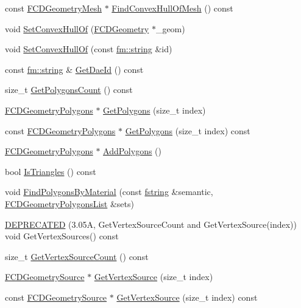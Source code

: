 \begin{DoxyCompactItemize}
const \hyperlink{classFCDGeometryMesh}{FCDGeometryMesh} $\ast$ \hyperlink{classFCDGeometryMesh_a0b975dd5d261b1185ddb8a0af4d55c9d}{FindConvexHullOfMesh} () const 
\item 
void \hyperlink{classFCDGeometryMesh_ab1698e8b1d977dd22bfd83812ecfd5bb}{SetConvexHullOf} (\hyperlink{classFCDGeometry}{FCDGeometry} $\ast$\_\-geom)
\item 
void \hyperlink{classFCDGeometryMesh_aaaceaa775bf5c5d83383184553effaa8}{SetConvexHullOf} (const \hyperlink{classfm_1_1stringT}{fm::string} \&id)
\item 
const \hyperlink{classfm_1_1stringT}{fm::string} \& \hyperlink{classFCDGeometryMesh_aa5a466bf4030f5569f45521e94bc4e55}{GetDaeId} () const 
\item 
size\_\-t \hyperlink{classFCDGeometryMesh_a4084371b8ae62cd07762775f81f9f613}{GetPolygonsCount} () const 
\item 
\hyperlink{classFCDGeometryPolygons}{FCDGeometryPolygons} $\ast$ \hyperlink{classFCDGeometryMesh_a990c21288535abe1d92c89b71ff662e3}{GetPolygons} (size\_\-t index)
\item 
const \hyperlink{classFCDGeometryPolygons}{FCDGeometryPolygons} $\ast$ \hyperlink{classFCDGeometryMesh_a99cbf42129bc06552153e4a2fc6a5910}{GetPolygons} (size\_\-t index) const 
\item 
\hyperlink{classFCDGeometryPolygons}{FCDGeometryPolygons} $\ast$ \hyperlink{classFCDGeometryMesh_a6a9c6a30b6cfc7d0a98a02b879c47e65}{AddPolygons} ()
\item 
bool \hyperlink{classFCDGeometryMesh_a490c6becbbbca137d2634c8d6ba818b9}{IsTriangles} () const 
\item 
void \hyperlink{classFCDGeometryMesh_a5a336363d9cb4f255d81ed8cf6fab8b7}{FindPolygonsByMaterial} (const \hyperlink{classfm_1_1stringT}{fstring} \&semantic, \hyperlink{classfm_1_1pvector}{FCDGeometryPolygonsList} \&sets)
\item 
\hyperlink{classFCDGeometryMesh_a0dd57bbe0bd7f6a2dfe58bdc140cf613}{DEPRECATED} (3.05A, GetVertexSourceCount and GetVertexSource(index)) void GetVertexSources() const 
\item 
size\_\-t \hyperlink{classFCDGeometryMesh_a5c0629b519bf32d5f4f172e3b0502de9}{GetVertexSourceCount} () const 
\item 
\hyperlink{classFCDGeometrySource}{FCDGeometrySource} $\ast$ \hyperlink{classFCDGeometryMesh_a728dd8d9dc103b9c9a4013dd882344ee}{GetVertexSource} (size\_\-t index)
\item 
const \hyperlink{classFCDGeometrySource}{FCDGeometrySource} $\ast$ \hyperlink{classFCDGeometryMesh_a9f0976292b2349fb3ed58940d6e80922}{GetVertexSource} (size\_\-t index) const 

\end{DoxyCompactItemize}
